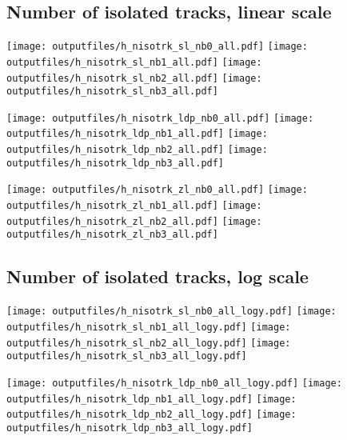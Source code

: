 \documentclass[11pt]{article}
\begin{document}
    \subsection{ Number of isolated tracks, linear scale}

    \noindent
     \texttt{[image: outputfiles/h\_nisotrk\_sl\_nb0\_all.pdf]}
     \texttt{[image: outputfiles/h\_nisotrk\_sl\_nb1\_all.pdf]}
     \texttt{[image: outputfiles/h\_nisotrk\_sl\_nb2\_all.pdf]}
     \texttt{[image: outputfiles/h\_nisotrk\_sl\_nb3\_all.pdf]}

    \noindent
     \texttt{[image: outputfiles/h\_nisotrk\_ldp\_nb0\_all.pdf]}
     \texttt{[image: outputfiles/h\_nisotrk\_ldp\_nb1\_all.pdf]}
     \texttt{[image: outputfiles/h\_nisotrk\_ldp\_nb2\_all.pdf]}
     \texttt{[image: outputfiles/h\_nisotrk\_ldp\_nb3\_all.pdf]}

    \noindent
     \texttt{[image: outputfiles/h\_nisotrk\_zl\_nb0\_all.pdf]}
     \texttt{[image: outputfiles/h\_nisotrk\_zl\_nb1\_all.pdf]}
     \texttt{[image: outputfiles/h\_nisotrk\_zl\_nb2\_all.pdf]}
     \texttt{[image: outputfiles/h\_nisotrk\_zl\_nb3\_all.pdf]}

    \clearpage


    \subsection{ Number of isolated tracks, log scale}

    \noindent
     \texttt{[image: outputfiles/h\_nisotrk\_sl\_nb0\_all\_logy.pdf]}
     \texttt{[image: outputfiles/h\_nisotrk\_sl\_nb1\_all\_logy.pdf]}
     \texttt{[image: outputfiles/h\_nisotrk\_sl\_nb2\_all\_logy.pdf]}
     \texttt{[image: outputfiles/h\_nisotrk\_sl\_nb3\_all\_logy.pdf]}

    \noindent
     \texttt{[image: outputfiles/h\_nisotrk\_ldp\_nb0\_all\_logy.pdf]}
     \texttt{[image: outputfiles/h\_nisotrk\_ldp\_nb1\_all\_logy.pdf]}
     \texttt{[image: outputfiles/h\_nisotrk\_ldp\_nb2\_all\_logy.pdf]}
     \texttt{[image: outputfiles/h\_nisotrk\_ldp\_nb3\_all\_logy.pdf]}
\end{document}
